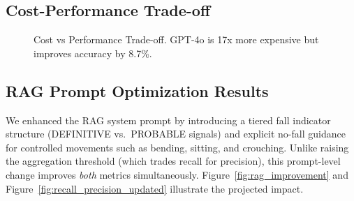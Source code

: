 \documentclass[conference]{IEEEtran}
\begin{document}
\subsection{Cost-Performance Trade-off}

\begin{figure}[!t]
\centering
{}
\caption{Cost vs Performance Trade-off. GPT-4o is 17x more expensive but improves accuracy by 8.7\%.}
\label{fig:cost_tradeoff}
\end{figure}

\subsection{RAG Prompt Optimization Results}

We enhanced the RAG system prompt by introducing a tiered fall indicator structure (DEFINITIVE vs.\ PROBABLE signals) and explicit no-fall guidance for controlled movements such as bending, sitting, and crouching. Unlike raising the aggregation threshold (which trades recall for precision), this prompt-level change improves \textit{both} metrics simultaneously. Figure~\ref{fig:rag_improvement} and Figure~\ref{fig:recall_precision_updated} illustrate the projected impact.
\end{document}
